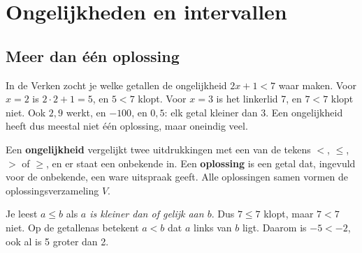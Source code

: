 \begin{oefeningen}[Start]

\end{oefeningen}

\section{Ongelijkheden en intervallen}

\subsection{Meer dan één oplossing}

In de Verken zocht je welke getallen de ongelijkheid $2x + 1 < 7$ waar maken. Voor $x = 2$ is $2 \cdot 2 + 1 = 5$, en $5 < 7$ klopt. Voor $x = 3$ is het linkerlid 7, en $7 < 7$ klopt niet. Ook $2{,}9$ werkt, en $-100$, en $0{,}5$: elk getal kleiner dan 3. Een ongelijkheid heeft dus meestal niet één oplossing, maar oneindig veel.

\begin{theorie}
Een \textbf{\textcolor{accent}{ongelijkheid}} vergelijkt twee uitdrukkingen met een van de tekens $<$, $\leqslant$, $>$ of $\geqslant$, en er staat een onbekende in. Een \textbf{\textcolor{accent}{oplossing}} is een getal dat, ingevuld voor de onbekende, een ware uitspraak geeft. Alle oplossingen samen vormen de oplossingsverzameling $V$.
\end{theorie}

Je leest $a \leqslant b$ als \textit{$a$ is kleiner dan of gelijk aan $b$}. Dus $7 \leqslant 7$ klopt, maar $7 < 7$ niet. Op de getallenas betekent $a < b$ dat $a$ links van $b$ ligt. Daarom is $-5 < -2$, ook al is 5 groter dan 2.


